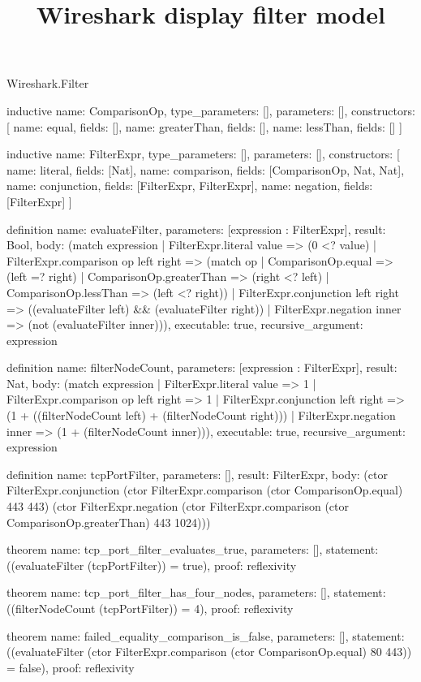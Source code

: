 \begin{lexlean}{Wireshark.Filter}
\title{Wireshark display filter model}
\begin{semanticmodule}
inductive{
  name: ComparisonOp,
  type_parameters: [],
  parameters: [],
  constructors: [
    {name: equal, fields: []},
    {name: greaterThan, fields: []},
    {name: lessThan, fields: []}
  ]
}

inductive{
  name: FilterExpr,
  type_parameters: [],
  parameters: [],
  constructors: [
    {name: literal, fields: [Nat]},
    {name: comparison, fields: [ComparisonOp, Nat, Nat]},
    {name: conjunction, fields: [FilterExpr, FilterExpr]},
    {name: negation, fields: [FilterExpr]}
  ]
}

definition{
  name: evaluateFilter,
  parameters: [expression : FilterExpr],
  result: Bool,
  body: (match expression
    | FilterExpr.literal value => (0 <? value)
    | FilterExpr.comparison op left right => (match op
      | ComparisonOp.equal => (left =? right)
      | ComparisonOp.greaterThan => (right <? left)
      | ComparisonOp.lessThan => (left <? right))
    | FilterExpr.conjunction left right => ((evaluateFilter left) && (evaluateFilter right))
    | FilterExpr.negation inner => (not (evaluateFilter inner))),
  executable: true,
  recursive_argument: expression
}

definition{
  name: filterNodeCount,
  parameters: [expression : FilterExpr],
  result: Nat,
  body: (match expression
    | FilterExpr.literal value => 1
    | FilterExpr.comparison op left right => 1
    | FilterExpr.conjunction left right => (1 + ((filterNodeCount left) + (filterNodeCount right)))
    | FilterExpr.negation inner => (1 + (filterNodeCount inner))),
  executable: true,
  recursive_argument: expression
}

definition{
  name: tcpPortFilter,
  parameters: [],
  result: FilterExpr,
  body: (ctor FilterExpr.conjunction (ctor FilterExpr.comparison (ctor ComparisonOp.equal) 443 443) (ctor FilterExpr.negation (ctor FilterExpr.comparison (ctor ComparisonOp.greaterThan) 443 1024)))
}

theorem{
  name: tcp_port_filter_evaluates_true,
  parameters: [],
  statement: ((evaluateFilter (tcpPortFilter)) = true),
  proof: reflexivity{}
}

theorem{
  name: tcp_port_filter_has_four_nodes,
  parameters: [],
  statement: ((filterNodeCount (tcpPortFilter)) = 4),
  proof: reflexivity{}
}

theorem{
  name: failed_equality_comparison_is_false,
  parameters: [],
  statement: ((evaluateFilter (ctor FilterExpr.comparison (ctor ComparisonOp.equal) 80 443)) = false),
  proof: reflexivity{}
}
\end{semanticmodule}
\end{lexlean}
